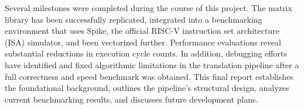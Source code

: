 Several milestones were completed during the course of this project. The matrix library has been successfully replicated, integrated into a benchmarking environment that uses Spike, the official RISC-V instruction set architecture (ISA) simulator, and been vectorized further. Performance evaluations reveal substantial reductions in execution cycle counts. In addition, debugging efforts have identified and fixed algorithmic limitations in the translation pipeline after a full correctness and speed benchmark was obtained. This final report establishes the foundational background, outlines the pipeline's structural design, analyzes current benchmarking results, and discusses future development plans.



